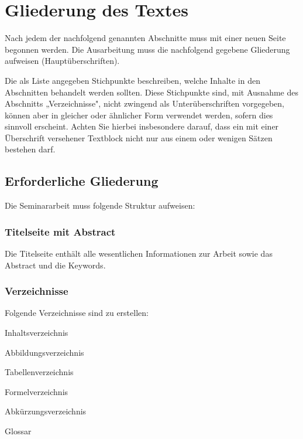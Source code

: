 
\chapter{Gliederung des Textes}
\label{chap:gliederung}

Nach jedem der nachfolgend genannten Abschnitte muss mit einer neuen Seite begonnen werden. Die Ausarbeitung muss die nachfolgend gegebene Gliederung aufweisen (Hauptüberschriften).

Die als Liste angegeben Stichpunkte beschreiben, welche Inhalte in den Abschnitten behandelt werden sollten. Diese Stichpunkte sind, mit Ausnahme des Abschnitts „Verzeichnisse", nicht zwingend als Unterüberschriften vorgegeben, können aber in gleicher oder ähnlicher Form verwendet werden, sofern dies sinnvoll erscheint. Achten Sie hierbei insbesondere darauf, dass ein mit einer Überschrift versehener Textblock nicht nur aus einem oder wenigen Sätzen bestehen darf.

\section{Erforderliche Gliederung}
\label{sec:erforderliche_gliederung}

Die Seminararbeit muss folgende Struktur aufweisen:

\subsection{Titelseite mit Abstract}
\label{subsec:titelseite}

Die Titelseite enthält alle wesentlichen Informationen zur Arbeit sowie das Abstract und die Keywords.

\subsection{Verzeichnisse}
\label{subsec:verzeichnisse}

Folgende Verzeichnisse sind zu erstellen:
\begin{listenabsatz}
	\item Inhaltsverzeichnis
	\item Abbildungsverzeichnis
	\item Tabellenverzeichnis
	\item Formelverzeichnis
	\item Abkürzungsverzeichnis
	\item Glossar
\end{listenabsatz}


